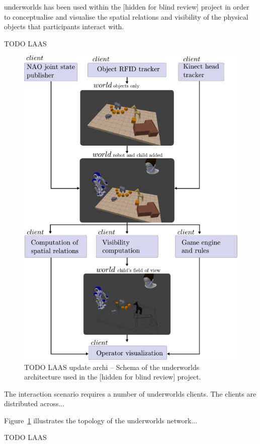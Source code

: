 \documentclass[conference]{IEEEtran}
\newcommand{\uwds}{{\sc underworlds}\xspace}
\begin{document}
\uwds has been used within the [hidden for blind review] project
in order to conceptualise and visualise the spatial relations and visibility of
the physical objects that participants interact with.

TODO LAAS

\begin{figure}
    \centering
    \includegraphics[width=0.9\linewidth]{l2tor}
    \caption{TODO LAAS update archi -- Schema of the \uwds architecture used in the [hidden for blind review] project. }
    \label{fig|mummerarchitecture}
\end{figure}

The interaction scenario requires a number of \uwds clients. The clients are
distributed across...

Figure~\ref{fig|mummerarchitecture} illustrates the topology of
the \uwds network...

TODO LAAS
\end{document}
